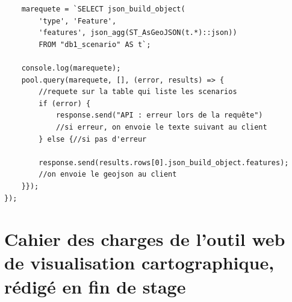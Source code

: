 \documentclass[10pt,a4paper]{report} %
\begin{document}
\begin{appendices}
\begin{verbatim}
    marequete = `SELECT json_build_object(
        'type', 'Feature',
        'features', json_agg(ST_AsGeoJSON(t.*)::json)) 
        FROM "db1_scenario" AS t`;

    console.log(marequete);
    pool.query(marequete, [], (error, results) => { 
        //requete sur la table qui liste les scenarios
        if (error) {
            response.send("API : erreur lors de la requête") 
            //si erreur, on envoie le texte suivant au client
        } else {//si pas d'erreur

        response.send(results.rows[0].json_build_object.features); 
        //on envoie le geojson au client
    }});
});

    \end{verbatim}

    \newpage
    \section{Cahier des charges de l’outil web de visualisation cartographique, rédigé en fin de stage}
    


\end{appendices}
\newpage

\newpage
\thispagestyle{empty}
\mbox{}
\newpage
\end{document}
